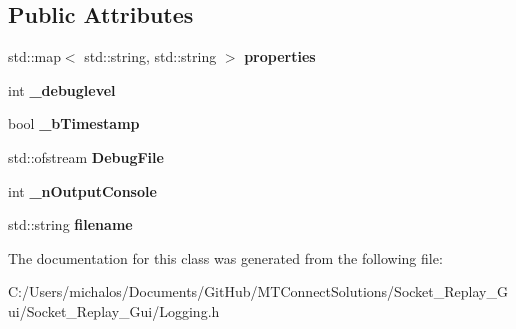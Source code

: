 \subsection*{Public Attributes}
\begin{DoxyCompactItemize}
\item 
\hypertarget{class_a_logger_a92c40eee23bd69472b83955a4367d2f5}{}std\+::map$<$ std\+::string, std\+::string $>$ {\bfseries properties}\label{class_a_logger_a92c40eee23bd69472b83955a4367d2f5}

\item 
\hypertarget{class_a_logger_a680c94f43da91fdd9644cdcd3ed62f46}{}int {\bfseries \+\_\+debuglevel}\label{class_a_logger_a680c94f43da91fdd9644cdcd3ed62f46}

\item 
\hypertarget{class_a_logger_a08e8858325f740fd3b6c27bb5f794e63}{}bool {\bfseries \+\_\+b\+Timestamp}\label{class_a_logger_a08e8858325f740fd3b6c27bb5f794e63}

\item 
\hypertarget{class_a_logger_ac794719a08e041b2adf5cad4449ba08e}{}std\+::ofstream {\bfseries Debug\+File}\label{class_a_logger_ac794719a08e041b2adf5cad4449ba08e}

\item 
\hypertarget{class_a_logger_a0b227d33030ccce4b5a0cbad3ce2aa9e}{}int {\bfseries \+\_\+n\+Output\+Console}\label{class_a_logger_a0b227d33030ccce4b5a0cbad3ce2aa9e}

\item 
\hypertarget{class_a_logger_a963caefa4b53d7fc416744c0150257af}{}std\+::string {\bfseries filename}\label{class_a_logger_a963caefa4b53d7fc416744c0150257af}

\end{DoxyCompactItemize}


The documentation for this class was generated from the following file\+:\begin{DoxyCompactItemize}
\item 
C\+:/\+Users/michalos/\+Documents/\+Git\+Hub/\+M\+T\+Connect\+Solutions/\+Socket\+\_\+\+Replay\+\_\+\+Gui/\+Socket\+\_\+\+Replay\+\_\+\+Gui/Logging.\+h\end{DoxyCompactItemize}
